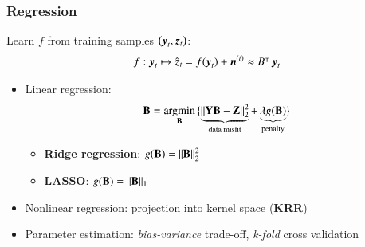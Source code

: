 \documentclass{beamer}
\let\olditem\item
\renewcommand{\item}{\setlength{\itemsep}{\fill}\olditem}
\begin{document}
\begin{frame}
\frametitle{Regression}	
	\begin{tcolorbox}[colback=red!5!white,colframe=red!75!black]	
		Learn $ f $ from training samples $ \left(\operatorname{\boldsymbol{y}}_t, \operatorname{\boldsymbol{z}}_t\right) $: 
		\begin{equation*}
			f:  \operatorname{\boldsymbol{y}}_t \mapsto  \hat{\operatorname{\boldsymbol{z}}}_t = f(\operatorname{\boldsymbol{y}}_t) + \operatorname{\boldsymbol{n}}^{(t)} \approx B^{\intercal}\operatorname{\boldsymbol{y}}_t 
		\end{equation*}
 	\end{tcolorbox}	
 	\begin{itemize} \itemsep0em
 	\item Linear regression:
 	\begin{equation*}
	 	\mathbf{B}= \operatorname*{\arg\!\min}_{\mathbf{B}}{ \{ \underbrace{\Vert \mathbf{Y}\mathbf{B}-\mathbf{Z}\Vert^2_2}_{\text{data misfit}} + \underbrace{\lambda g(\mathbf{B})}_{\text{penalty}} \} }
 	\end{equation*}
	\begin{itemize}
		\item \textbf{\color{red}Ridge regression}: $ g(\mathbf{B}) = \Vert \mathbf{B}\Vert^2_2 $
		\item \textbf{\color{red}LASSO}: $ g(\mathbf{B}) = \Vert \mathbf{B}\Vert_1 $
	\end{itemize} 	
	
	\item Nonlinear regression: projection into kernel space (\textbf{\color{red}KRR})
	\item Parameter estimation: \emph{bias-variance} trade-off, \textit{k-fold} cross validation
	\end{itemize} 	
\end{frame}
\end{document}
